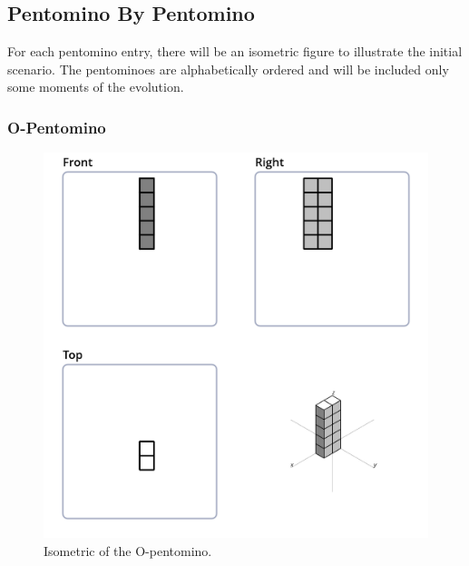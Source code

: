 
\subsection{Pentomino By Pentomino}
For each pentomino entry, there will be an isometric figure to illustrate the
initial scenario. The pentominoes are alphabetically ordered and will be included
only some moments of the evolution.

\subsubsection{O-Pentomino}
\label{sec:o-pentomino}

\begin{figure}[H]
	\centering
	\includegraphics[scale=0.3]{iso_diagrams/o.png}
	\caption{Isometric of the O-pentomino.}
	\label{fig:iso-pent-o}
\end{figure}

